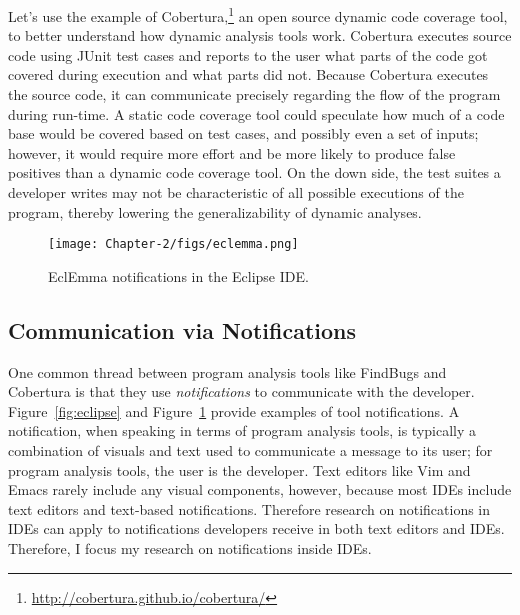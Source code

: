Let's use the example of Cobertura,\footnote{\url{http://cobertura.github.io/cobertura/}} an open source dynamic code coverage tool, to better understand how dynamic analysis tools work. Cobertura executes source code using JUnit test cases and reports to the user what parts of the code got covered during execution and what parts did not. Because Cobertura executes the source code, it can communicate precisely regarding the flow of the program during run-time. A static code coverage tool could speculate how much of a code base would be covered based on test cases, and possibly even a set of inputs; however, it would require more effort and be more likely to produce false positives than a dynamic code coverage tool. On the down side, the test suites a developer writes may not be characteristic of all possible executions of the program, thereby lowering the generalizability of dynamic analyses.

\begin{figure} [ht]
	\centering
	\texttt{[image: Chapter-2/figs/eclemma.png]}
	\caption{EclEmma notifications in the Eclipse IDE.}
	\label{fig:ecl}
\end{figure}


\subsection{Communication via Notifications}\label{subsec:comm}

One common thread between program analysis tools like FindBugs and Cobertura is that they use \emph{notifications} to communicate with the developer. Figure~\ref{fig:eclipse} and Figure~\ref{fig:ecl} provide examples of tool notifications. 
A notification, when speaking in terms of program analysis tools, is typically a combination of visuals and text used to communicate a message to its user; for program analysis tools, the user is the developer.
Text editors like Vim and Emacs rarely include any visual components, however, because most IDEs include text editors and text-based notifications. Therefore research on notifications in IDEs can apply to notifications developers receive in both text editors and IDEs. 
Therefore, I focus my research on notifications inside IDEs.

